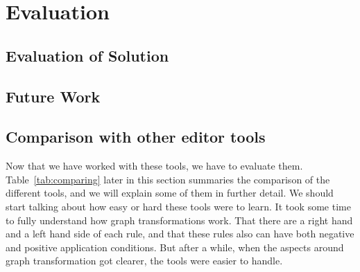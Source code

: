 
\chapter{Evaluation} %

\label{Chapter6} %



\section{Evaluation of Solution}

\section{Future Work}


\section{Comparison with other editor tools}

Now that we have worked with these tools, we have to evaluate them.
Table~\ref{tab:comparing} later in this section summaries the comparison of the
different tools, and we will explain some of them in further detail. We should
start talking about how easy or hard these tools were to learn. It took some
time to fully understand how graph transformations work. That there are a right
hand and a left hand side of each rule, and that these rules also can have both
negative and positive application conditions. But after a while, when the
aspects around graph transformation got clearer, the tools were easier to handle.

